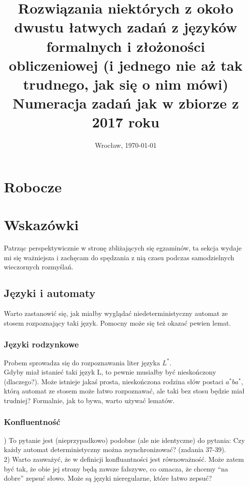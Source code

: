 \documentclass[a4paper,11pt]{article}
\date{Wrocław, \today}
\title{\LARGE{\textbf{Rozwiązania niektórych z około dwustu łatwych zadań z języków formalnych i złożoności obliczeniowej 
(i jednego nie aż tak trudnego, jak się o nim mówi)}\\\Large{Numeracja zadań jak w zbiorze z 2017 roku}}}
\author{}
\newenvironment{zadanie}[1]
  {\renewcommand\theinnercustomthm{#1}\innercustomthm}
  {\endinnercustomthm}
\begin{document}
\maketitle

\section{Robocze}

\section{Wskazówki}

Patrząc perspektywicznie w stronę zbliżających się egzaminów, ta sekcja wydaje mi się ważniejsza i zachęcam do spędzania z nią
czasu podczas samodzielnych wieczornych rozmyślań.

\subsection{Języki i automaty}

\begin{zadanie}{63}
Warto zastanowić się, jak miałby wyglądać niedeterministyczny automat ze stosem rozpoznający taki język. Pomocny może się też
okazać pewien lemat.
\end{zadanie}

\subsubsection{Języki rodzynkowe}

\begin{zadanie}{71}
Probem sprowadza się do rozpoznawania liter języka $L^*$. \\
Gdyby miał istanieć taki język L, to pewnie musiałby być nieskończony (dlaczego?). Może istnieje jakaś prosta, nieskończona
rodzina słów postaci $a^*ba^*$, którą automat ze stosem może łatwo rozpoznawać, ale taki bez stosu będzie miał trudniej?
Formalnie, jak to bywa, warto używać lematów.
\end{zadanie}

\subsubsection{Konfluentność}

\begin{zadanie}{74}
1) To pytanie jest (nieprzypadkowo) podobne (ale nie identyczne) do pytania: Czy każdy automat deterministyczny można 
zsynchronizować? (zadania 37-39). \\
2) Warto zauważyć, że w definicji konfluantności jest równoważność. Może zatem być tak, że obie jej strony będą zawsze fałszywe,
co oznacza, że chcemy ``na dobre'' zepsuć słowo. Może są języki nieregularne, które łatwo zepsuć?
\end{zadanie}
\end{document}
